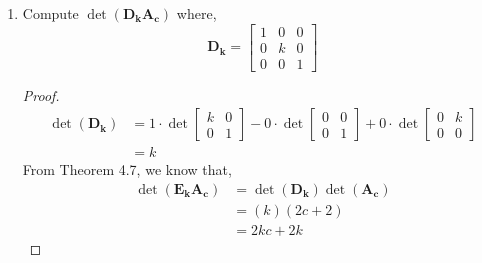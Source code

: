 \documentclass[11pt]{scrartcl}
\begin{document}
\begin{enumerate}[label=\alph*.]
{\begin{proof}
\begin{align*}
			                                    & = 1
		      \end{align*}
		      From Theorem 4.7, we know that,
		      \begin{align*}
			      \det(\mathbf{E}_{\mathbf{k}}\mathbf{A}_{\mathbf{c}}) & = \det(\mathbf{E}_{\mathbf{k}}) \det(\mathbf{A}_{\mathbf{c}}) \\
			                                                           & = (1) (2c + 2)                                                \\
			                                                           & = 2c + 2
		      \end{align*}
	      \end{proof}
	      }

	\item{
	      Compute $\det(\mathbf{D}_{\mathbf{k}}\mathbf{A}_{\mathbf{c}})$ where,
	      $$
		      \mathbf{D}_{\mathbf{k}} = \begin{bmatrix}
			      1 & 0 & 0 \\
			      0 & k & 0 \\
			      0 & 0 & 1
		      \end{bmatrix}
	      $$
	      \begin{proof}
		      \begin{align*}
			      \det(\mathbf{D}_{\mathbf{k}}) & = 1\cdot \det \begin{bmatrix}k&0\\ 0&1\end{bmatrix}-0\cdot \det \begin{bmatrix}0&0\\ 0&1\end{bmatrix}+0\cdot \det \begin{bmatrix}0&k\\ 0&0\end{bmatrix} \\
			                                    & = k
		      \end{align*}
		      From Theorem 4.7, we know that,
		      \begin{align*}
			      \det(\mathbf{E}_{\mathbf{k}}\mathbf{A}_{\mathbf{c}}) & = \det(\mathbf{D}_{\mathbf{k}}) \det(\mathbf{A}_{\mathbf{c}}) \\
			                                                           & = (k) (2c + 2)                                                \\
			                                                           & = 2kc + 2k
		      \end{align*}

\end{proof}}
\end{enumerate}
\end{document}

